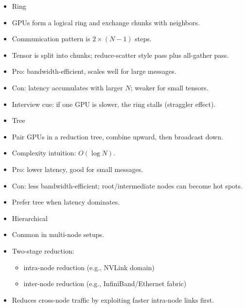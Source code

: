 \documentclass[12pt]{article}
\begin{document}
\begin{itemize}
\item Ring
\item GPUs form a logical ring and exchange chunks with neighbors.
\item Communication pattern is \(2 \times (N-1)\) steps.
\item Tensor is split into chunks; reduce-scatter style pass plus all-gather pass.
\item Pro: bandwidth-efficient, scales well for large messages.
\item Con: latency accumulates with larger \(N\); weaker for small tensors.
\item Interview cue: if one GPU is slower, the ring stalls (straggler effect).
\item Tree
\item Pair GPUs in a reduction tree, combine upward, then broadcast down.
\item Complexity intuition: \(O(\log N)\).
\item Pro: lower latency, good for small messages.
\item Con: less bandwidth-efficient; root/intermediate nodes can become hot spots.
\item Prefer tree when latency dominates.
\item Hierarchical
\item Common in multi-node setups.
\item Two-stage reduction:
\begin{itemize}
\item intra-node reduction (e.g., NVLink domain)
\item inter-node reduction (e.g., InfiniBand/Ethernet fabric)
\end{itemize}
\item Reduces cross-node traffic by exploiting faster intra-node links first.
\end{itemize}
\end{document}
